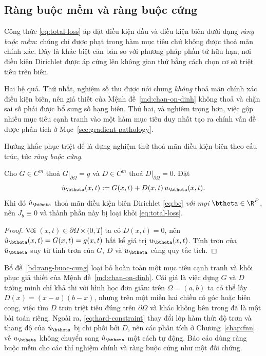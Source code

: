 \subsection{Ràng buộc mềm và ràng buộc cứng}
\label{subsec:rang-buoc}
 
\begin{nhanxet}
\label{rem:soft-constraint}
Công thức \eqref{eq:total-loss} áp đặt điều kiện đầu và điều kiện biên dưới dạng
\emph{ràng buộc mềm}: chúng chỉ được phạt trong hàm mục tiêu chứ không được thoả
mãn chính xác. Đây là khác biệt căn bản so với phương pháp phần tử hữu hạn, nơi
điều kiện Dirichlet được áp cứng lên không gian thử bằng cách chọn cơ sở triệt
tiêu trên biên.
 
Hai hệ quả. Thứ nhất, nghiệm số thu được nói chung \emph{không} thoả mãn chính
xác điều kiện biên, nên giả thiết của Mệnh đề~\ref{md:chan-on-dinh} không thoả
và chặn sai số phải được bổ sung số hạng biên. Thứ hai, và nghiêm trọng hơn, việc
gộp nhiều mục tiêu cạnh tranh vào một hàm mục tiêu duy nhất tạo ra chính vấn đề
được phân tích ở Mục~\ref{sec:gradient-pathology}.
\end{nhanxet}
 
Hướng khắc phục triệt để là dựng nghiệm thử thoả mãn điều kiện biên theo cấu
trúc, tức \emph{ràng buộc cứng}.
 
\begin{bode}
\label{bd:rang-buoc-cung}
Cho $G \in C^{m}$ thoả $G|_{\partial\Omega} = g$ và $D \in C^{m}$ thoả
$D|_{\partial\Omega} = 0$. Đặt
\begin{equation}
\hat{u}_{\btheta}(x,t) := G(x,t) + D(x,t)\, u_{\btheta}(x,t).
\label{eq:hard-constraint}
\end{equation}
Khi đó $\hat{u}_{\btheta}$ thoả mãn điều kiện biên Dirichlet \eqref{eq:bc}
\emph{với mọi} $\btheta \in \R^P$, nên $J_b \equiv 0$ và thành phần này bị loại
khỏi \eqref{eq:total-loss}.
\end{bode}
 
\begin{proof}
Với $(x,t) \in \partial\Omega\times(0,T]$ ta có $D(x,t) = 0$, nên
$\hat u_{\btheta}(x,t) = G(x,t) = g(x,t)$ bất kể giá trị $u_{\btheta}(x,t)$.
Tính trơn của $\hat u_{\btheta}$ suy từ tính trơn của $G$, $D$ và
$u_{\btheta}$ cùng quy tắc tích.
\end{proof}
 
Bổ đề~\ref{bd:rang-buoc-cung} loại bỏ hoàn toàn một mục tiêu cạnh tranh và khôi
phục giả thiết của Mệnh đề~\ref{md:chan-on-dinh}. Cái giá là việc dựng $G$ và $D$
tường minh chỉ khả thi với hình học đơn giản: trên $\Omega = (a,b)$ ta có thể lấy
$D(x) = (x-a)(b-x)$, nhưng trên một miền hai chiều có góc hoặc biên cong, việc
tìm $D$ trơn triệt tiêu đúng trên $\partial\Omega$ và khác không bên trong đã là
một bài toán riêng. Ngoài ra, \eqref{eq:hard-constraint} thay đổi lớp hàm thử: độ
trơn và thang độ của $\hat u_{\btheta}$ bị chi phối bởi $D$, nên các phân tích ở
Chương~\ref{chap:fnn} về $u_{\btheta}$ không chuyển sang $\hat u_{\btheta}$ một
cách tự động. Báo cáo dùng ràng buộc mềm cho các thí nghiệm chính và ràng buộc
cứng như một đối chứng.
 
